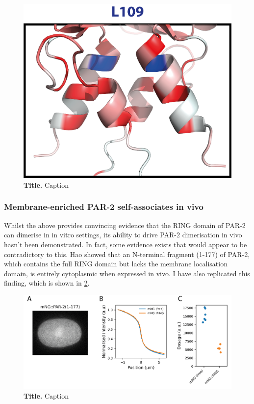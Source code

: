 \documentclass[12pt]{"article"}
\newcommand{\mycaption}[2]{\caption[#1]{\textbf{#1.} #2}}
\begin{document}
\begin{figure}[!h]
\includegraphics[scale=1]{l109_structure}
\setlength{\abovecaptionskip}{20pt}
\centering
\mycaption{Title}{Caption}
\label{fig:l109_structure}
\end{figure}


\clearpage
\subsubsection{Membrane-enriched PAR-2 self-associates in vivo}

Whilst the above provides convincing evidence that the RING domain of PAR-2 can dimerise in in vitro settings, its ability to drive PAR-2 dimerisation in vivo hasn't been demonstrated. In fact, some evidence exists that would appear to be contradictory to this. Hao showed that an N-terminal fragment (1-177) of PAR-2, which contains the full RING domain but lacks the membrane localisation domain, is entirely cytoplasmic when expressed in vivo. I have also replicated this finding, which is shown in \cref{fig:ring_fragment_in_vivo}.\\

\begin{figure}[!h]
\includegraphics[scale=0.9]{ring_fragment_in_vivo}
\setlength{\abovecaptionskip}{20pt}
\centering
\mycaption{Title}{Caption}
\label{fig:ring_fragment_in_vivo}
\end{figure}
\end{document}
